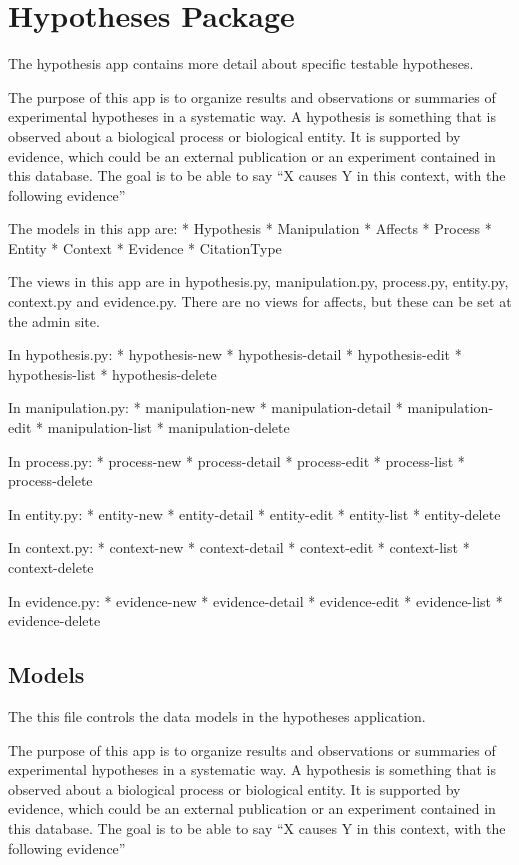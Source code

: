 \documentclass[letterpaper,10pt,english]{sphinxmanual}
\begin{document}
\section{Hypotheses Package}
\label{api:module-experimentdb.hypotheses}\label{api:hypotheses-package}
The hypothesis app contains more detail about specific testable hypotheses.


The purpose of this app is to organize results and observations or summaries of experimental hypotheses in a systematic way.  A hypothesis is something that is observed about a biological process or biological entity.  It is supported by evidence, which could be an external publication or an experiment contained in this database.  The goal is to be able to say ``X causes Y in this context, with the following evidence''


The models in this app are:
* Hypothesis
* Manipulation
* Affects
* Process
* Entity
* Context
* Evidence
* CitationType


The views in this app are in hypothesis.py, manipulation.py, process.py, entity.py, context.py and evidence.py.  There are no views for affects, but these can be set at the admin site.


In hypothesis.py:
* hypothesis-new
* hypothesis-detail
* hypothesis-edit
* hypothesis-list
* hypothesis-delete


In manipulation.py:
* manipulation-new
* manipulation-detail
* manipulation-edit
* manipulation-list
* manipulation-delete


In process.py:
* process-new
* process-detail
* process-edit
* process-list
* process-delete


In entity.py:
* entity-new
* entity-detail
* entity-edit
* entity-list
* entity-delete


In context.py:
* context-new
* context-detail
* context-edit
* context-list
* context-delete


In evidence.py:
* evidence-new
* evidence-detail
* evidence-edit
* evidence-list
* evidence-delete



\subsection{Models}
\label{api:id27}\label{api:module-experimentdb.hypotheses.models}
The this file controls the data models in the hypotheses application.


The purpose of this app is to organize results and observations or summaries of experimental hypotheses in a systematic way.  A hypothesis is something that is observed about a biological process or biological entity.  It is supported by evidence, which could be an external publication or an experiment contained in this database.  The goal is to be able to say ``X causes Y in this context, with the following evidence''
\end{document}
